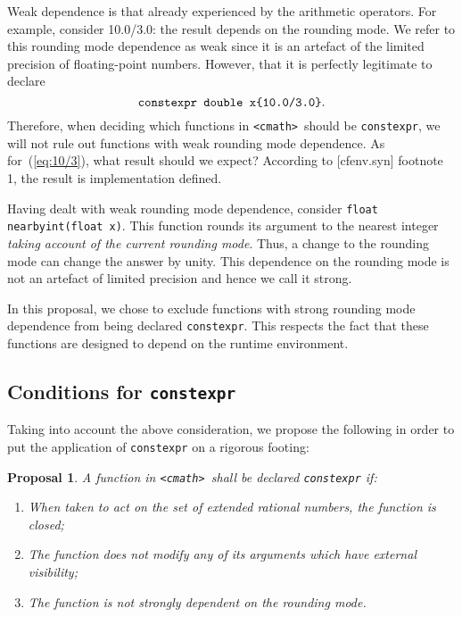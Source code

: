 \documentclass[prd,twocolumn,amsmath,amssymb,nofootinbib,eqsecnum]{revtex4-1}
\newcommand{\constexpr}{\code{constexpr}\xspace}
\newcommand{\code}[1]{{\tt #1}}
\newcommand{\header}[1]{{\tt <#1>}}
\newcommand{\cmath}{\header{cmath}}
\newcommand{\eq}[1]{(\ref{eq:#1})}
\newtheorem*{proposal*}{Proposal}
\begin{document}
Weak dependence is that already experienced by the arithmetic operators. For example, consider 10.0/3.0: the result depends on the rounding mode. We refer to this rounding mode dependence as weak since it is an artefact of the limited precision of floating-point numbers. However, that it is perfectly legitimate to declare
\begin{equation}
	\mbox{\code{constexpr double x\{10.0/3.0\}}}.
\label{eq:10/3}
\end{equation}
Therefore, when deciding which functions in \cmath\ should be \constexpr, we will not rule out functions with weak rounding mode dependence.
As for~\eq{10/3}, what result should we expect? According to [cfenv.syn] footnote 1, the result is implementation defined. 

Having dealt with weak rounding mode dependence, consider \code{float nearbyint(float x)}. This function rounds its argument to the nearest integer \emph{taking account of the current rounding mode}. Thus, a change to the rounding mode can change the answer by unity. This dependence on the rounding mode is not an artefact of limited precision and hence we call it strong.

In this proposal, we chose to exclude functions with strong rounding mode dependence from being declared \constexpr. This respects the fact that these functions are designed to depend on the runtime environment.


\subsection{Conditions for \constexpr}

Taking into account the above consideration, we propose the following in order to put
the application of \constexpr on a rigorous footing:
\begin{proposal*}
	A function in \cmath\ shall be declared \constexpr if:
	\begin{enumerate}
		\item When taken to act on the set of extended rational numbers, the function is closed;
		
		\item The function does not modify any of its arguments which have external visibility;
		
		\item The function is not strongly dependent on the rounding mode.
	\end{enumerate}
\end{proposal*}
\end{document}
